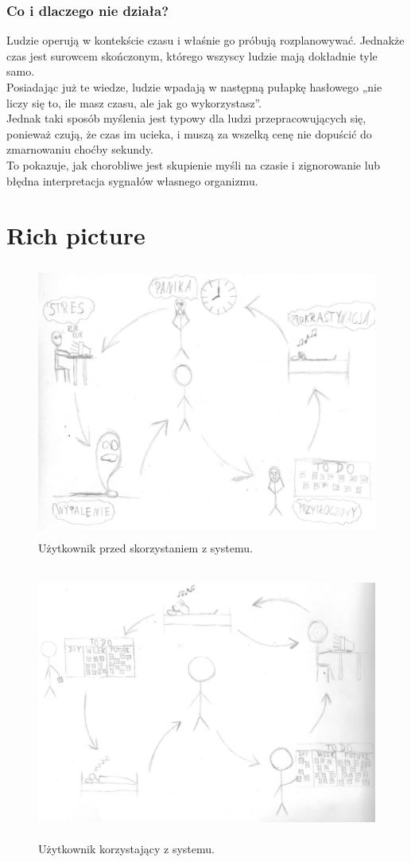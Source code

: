 \documentclass[a4paper,11pt]{report}
\begin{document}
\subsubsection{Co i dlaczego nie działa?}
Ludzie operują w kontekście czasu i właśnie go próbują rozplanowywać. Jednakże czas jest surowcem skończonym, którego wszyscy ludzie mają dokładnie tyle samo.
\\Posiadając już te wiedze, ludzie wpadają w następną pułapkę hasłowego „nie liczy się to, ile masz czasu, ale jak go wykorzystasz”.
\\Jednak taki sposób myślenia jest typowy dla ludzi przepracowujących się, ponieważ czują, że czas im ucieka, i muszą za wszelką cenę nie dopuścić do zmarnowaniu choćby sekundy.
\\To pokazuje, jak chorobliwe jest skupienie myśli na czasie i zignorowanie lub błędna interpretacja sygnałów własnego organizmu.
\section {Rich picture}
\begin{figure}[h]
	\centering
	\includegraphics[width=\textwidth, height=9cm]{richpicture1.jpg}
	\caption{Użytkownik przed skorzystaniem z systemu.}
	\label{fig:rich1}
\end{figure}
\begin{figure}[h]
	\centering
	\includegraphics[width=\textwidth, height=9cm]{richpicture2.jpg}
	\caption{Użytkownik korzystający z systemu.}
	\label{fig:rich2}
\end{figure}
\end{document}
